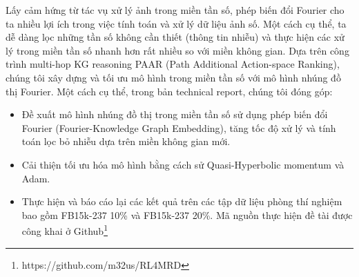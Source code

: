 Lấy cảm hứng từ tác vụ xử lý ảnh trong miền tần số, phép biến đổi Fourier cho ta nhiều lợi ích trong việc tính toán và xử lý dữ liệu ảnh số. Một cách cụ thể, ta dễ dàng lọc những tần số không cần thiết (thông tin nhiễu) và thực hiện các xử lý trong miền tần số nhanh hơn rất nhiều so với miền không gian. Dựa trên công trình multi-hop KG reasoning PAAR (Path Additional Action-space Ranking), chúng tôi xây dựng và tối ưu mô hình trong miền tần số với mô hình nhúng đồ thị Fourier. Một cách cụ thể, trong bản technical report, chúng tôi đóng góp:
\begin{itemize}
    \item Đề xuất mô hình nhúng đồ thị trong miền tần số sử dụng phép biến đổi Fourier (Fourier-Knowledge Graph Embedding), tăng tốc độ xử lý và tính toán lọc bỏ nhiễu dựa trên miền không gian mới.
    \item Cải thiện tối ưu hóa mô hình bằng cách sử Quasi-Hyperbolic momentum và Adam.
    \item Thực hiện và báo cáo lại các kết quả trên các tập dữ liệu phòng thí nghiệm bao gồm FB15k-237 10\% và FB15k-237 20\%. Mã nguồn thực hiện đề tài được công khai ở Github\footnote{https://github.com/m32us/RL4MRD}
\end{itemize}